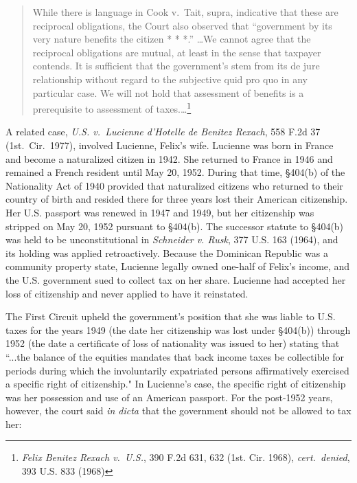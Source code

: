 \begin{quote} 

While there is language in Cook v.\ Tait, supra, indicative that these are reciprocal obligations, the Court also observed that ``government by its very nature benefits the citizen * * *.'' \ldots We cannot agree that the reciprocal obligations are mutual, at least in the sense that taxpayer contends.  It is sufficient that the government's stem from its de jure relationship without regard to the subjective quid pro quo in any particular case. We will not hold that assessment of benefits is a prerequisite to assessment of taxes.\ldots\footnote{\textit{Felix Benitez Rexach v.\ U.S.}, 390 F.2d 631, 632 (1st. Cir. 1968), \emph{cert.\ denied}, 393 U.S. 833 (1968)}

\end{quote}

 A related case, \textit{U.S. v.\ Lucienne d'Hotelle de Benitez Rexach}, 558 F.2d 37 (1st.\ Cir.\ 1977), involved Lucienne, Felix's wife.  Lucienne was born in France and become a naturalized citizen in 1942.  She returned to France in 1946 and remained a French resident until May 20, 1952. During that time, \S 404(b) of the Nationality Act of 1940 provided that naturalized citizens who returned to their country of birth and resided there for three years lost their American citizenship. Her U.S. passport was renewed in 1947 and 1949, but her citizenship was stripped on May 20, 1952 pursuant to \S 404(b).  The successor statute to \S404(b) was held to be unconstitutional in \textit{Schneider v. Rusk}, 377 U.S. 163 (1964), and its holding was applied retroactively.  Because the Dominican Republic was a community property state, Lucienne legally owned one-half of Felix's income, and the U.S. government sued to collect tax on her share.  Lucienne had accepted her loss of citizenship and never applied to have it reinstated.
 
The First Circuit upheld the government's position that she was liable to U.S. taxes for the years 1949 (the date her citizenship was lost under \S 404(b)) through 1952 (the date a certificate of loss of nationality was issued to her) stating that ``...the balance of the equities mandates that back income taxes be collectible for periods during which the involuntarily expatriated persons affirmatively exercised a specific right of citizenship."  In Lucienne's case, the specific right of citizenship was her possession and use of an American passport.  For the post-1952 years, however, the court said \textit{in dicta} that the government should not be allowed to tax her:  

